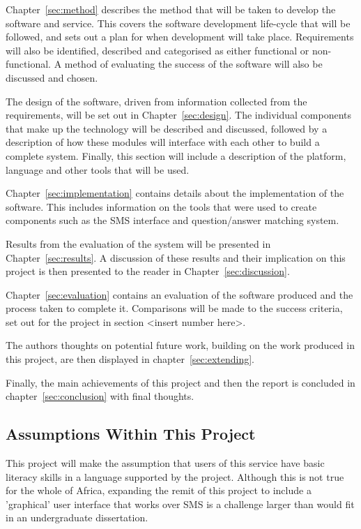 \documentclass{article}
\begin{document}
Chapter~\ref{sec:method} describes the method that will be taken to develop the software and service.  This covers the software development life-cycle that will be followed, and sets out a plan for when development will take place.  Requirements will also be identified, described and categorised  as either functional or non-functional.  A method of evaluating the success of the software will also be discussed and chosen.

The design of the software, driven from information collected from the requirements, will be set out in Chapter~\ref{sec:design}.  The individual components that make up the technology will be described and discussed, followed by a description of how these modules will interface with each other to build a complete system.  Finally, this section will include a description of the platform, language and other tools that will be used.

Chapter~\ref{sec:implementation} contains details about the implementation of the software.  This includes information on the tools that were used to create components such as the SMS interface and question/answer matching system.

Results from the evaluation of the system will be presented in Chapter~\ref{sec:results}.  A discussion of these results and their implication on this project is then presented to the reader in Chapter~\ref{sec:discussion}.

Chapter~\ref{sec:evaluation} contains an evaluation of the software produced and the process taken to complete it.  Comparisons will be made to the success criteria, set out for the project in section <insert number here>.

The authors thoughts on potential future work, building on the work produced in this project, are then displayed in chapter~\ref{sec:extending}.  

Finally, the main achievements of this project and then the report is concluded in chapter~\ref{sec:conclusion} with final thoughts.


\subsection{Assumptions Within This Project}
This project will make the assumption that users of this service have basic literacy skills in a language supported by the project.  Although this is not true for the whole of Africa, expanding the remit of this project to include a 'graphical' user interface that works over SMS is a challenge larger than would fit in an undergraduate dissertation.
\end{document}
